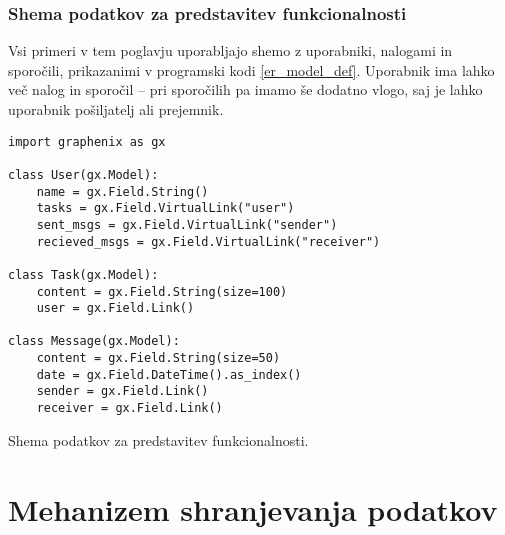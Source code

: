 \documentclass[a4paper,12pt,openright]{book}
\begin{document}
    \subsubsection{Shema podatkov za predstavitev funkcionalnosti}
    Vsi primeri v tem poglavju uporabljajo shemo z uporabniki, nalogami in sporočili, prikazanimi v programski kodi \ref{er_model_def}. Uporabnik ima lahko več nalog in sporočil – pri sporočilih pa imamo še dodatno vlogo, saj je lahko uporabnik pošiljatelj ali prejemnik.


\newpage
\begin{code}
\begin{verbatim}
import graphenix as gx

class User(gx.Model):
    name = gx.Field.String()
    tasks = gx.Field.VirtualLink("user")
    sent_msgs = gx.Field.VirtualLink("sender")
    recieved_msgs = gx.Field.VirtualLink("receiver")

class Task(gx.Model):
    content = gx.Field.String(size=100)
    user = gx.Field.Link()

class Message(gx.Model):
    content = gx.Field.String(size=50)
    date = gx.Field.DateTime().as_index()
    sender = gx.Field.Link()
    receiver = gx.Field.Link()
\end{verbatim}
\caption{Shema podatkov za predstavitev funkcionalnosti.}
\label{er_model_def}
\end{code}
    
    \section{Mehanizem shranjevanja podatkov}
\end{document}
